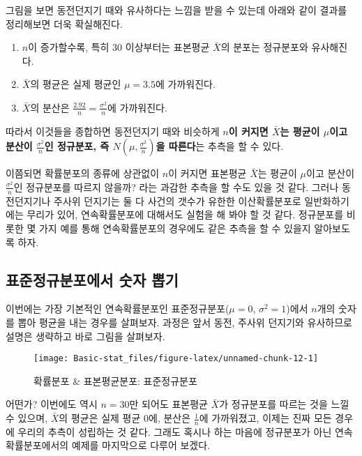 \documentclass[]{book}
\providecommand{\tightlist}{%
  \setlength{\itemsep}{0pt}\setlength{\parskip}{0pt}}
\begin{document}
그림을 보면 동전던지기 때와 유사하다는 느낌을 받을 수 있는데 아래와 같이 결과를 정리해보면 더욱 확실해진다.

\begin{enumerate}
\def\labelenumi{\arabic{enumi}.}
\tightlist
\item
  \(n\)이 증가할수록, 특히 30 이상부터는 표본평균 \(\bar{X}\)의 분포는 정규분포와 유사해진다.
\item
  \(\bar{X}\)의 평균은 실제 평균인 \(\mu=3.5\)에 가까워진다.
\item
  \(\bar{X}\)의 분산은 \(\frac{2.92}{n}=\frac{\sigma^2}{n}\)에 가까워진다.
\end{enumerate}

따라서 이것들을 종합하면 동전던지기 때와 비슷하게 \textbf{\(n\)이 커지면 \(\bar{X}\)는 평균이 \(\mu\)이고 분산이 \(\frac{\sigma^2}{n}\)인 정규분포, 즉 \(N(\mu,\frac{\sigma^2}{n})\)을 따른다}는 추측을 할 수 있다.

이쯤되면 확률분포의 종류에 상관없이 \(n\)이 커지면 표본평균 \(\bar{X}\)는 평균이 \(\mu\)이고 분산이 \(\frac{\sigma^2}{n}\)인 정규분포를 따르지 않을까? 라는 과감한 추측을 할 수도 있을 것 같다. 그러나 동전던지기나 주사위 던지기는 둘 다 사건의 갯수가 유한한 이산확률분포로 일반화하기에는 무리가 있어, 연속확률분포에 대해서도 실험을 해 봐야 할 것 같다. 정규분포를 비롯한 몇 가지 예를 통해 연속확률분포의 경우에도 같은 추측을 할 수 있을지 알아보도록 하자.

\hypertarget{uxd45cuxc900uxc815uxaddcuxbd84uxd3ecuxc5d0uxc11c-uxc22buxc790-uxbf51uxae30}{%
\subsection{표준정규분포에서 숫자 뽑기}\label{uxd45cuxc900uxc815uxaddcuxbd84uxd3ecuxc5d0uxc11c-uxc22buxc790-uxbf51uxae30}}

이번에는 가장 기본적인 연속확률분포인 표준정규분포(\(\mu=0\), \(\sigma^2=1\))에서 \(n\)개의 숫자를 뽑아 평균을 내는 경우를 살펴보자. 과정은 앞서 동전, 주사위 던지기와 유사하므로 설명은 생략하고 바로 그림을 살펴보자.

\begin{figure}

{\centering \texttt{[image: Basic-stat\_files/figure-latex/unnamed-chunk-12-1]} 

}

\caption{확률분포 & 표본평균분포: 표준정규분포}\label{fig:unnamed-chunk-12}
\end{figure}

어떤가? 이번에도 역시 \(n=30\)만 되어도 표본평균 \(\bar{X}\)가 정규분포를 따르는 것을 느낄 수 있으며, \(\bar{X}\)의 평균은 실제 평균 0에, 분산은 \(\frac{1}{n}\)에 가까워졌고, 이제는 진짜 모든 경우에 우리의 추측이 성립하는 것 같다. 그래도 혹시나 하는 마음에 정규분포가 아닌 연속확률분포에서의 예제를 마지막으로 다루어 보겠다.
\end{document}
